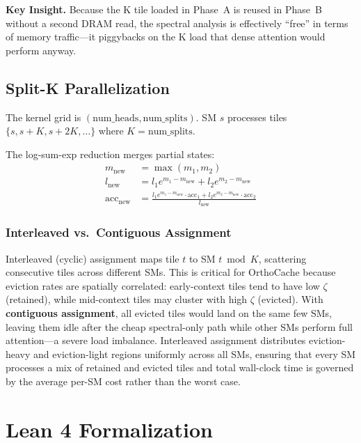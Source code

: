 \documentclass[conference]{IEEEtran}
\begin{document}
\textbf{Key Insight.}
Because the K tile loaded in Phase~A is reused in Phase~B without a
second DRAM read, the spectral analysis is effectively ``free'' in
terms of memory traffic---it piggybacks on the K load that dense
attention would perform anyway.

\subsection{Split-K Parallelization}\label{sec:splitk}

The kernel grid is $(\text{num\_heads}, \text{num\_splits})$. SM $s$
processes tiles $\{s, s+K, s+2K, \ldots\}$ where $K = \text{num\_splits}$.

The log-sum-exp reduction merges partial states:
\begin{align}
m_{\text{new}} &= \max(m_1, m_2) \\
l_{\text{new}} &= l_1 e^{m_1 - m_{\text{new}}} + l_2 e^{m_2 - m_{\text{new}}} \\
\text{acc}_{\text{new}} &= \frac{l_1 e^{m_1 - m_{\text{new}}} \cdot \text{acc}_1 + l_2 e^{m_2 - m_{\text{new}}} \cdot \text{acc}_2}{l_{\text{new}}}
\end{align}

\subsubsection{Interleaved vs.\ Contiguous Assignment}

Interleaved (cyclic) assignment maps tile $t$ to SM $t \bmod K$,
scattering consecutive tiles across different SMs. This is critical
for OrthoCache because eviction rates are spatially correlated:
early-context tiles tend to have low $\zeta$ (retained), while
mid-context tiles may cluster with high $\zeta$ (evicted).
With \textbf{contiguous assignment}, all evicted tiles would land on
the same few SMs, leaving them idle after the cheap spectral-only
path while other SMs perform full attention---a severe load imbalance.
Interleaved assignment distributes eviction-heavy and eviction-light
regions uniformly across all SMs, ensuring that every SM processes a
mix of retained and evicted tiles and total wall-clock time is
governed by the average per-SM cost rather than the worst case.


\section{Lean 4 Formalization}\label{sec:lean}
\end{document}
